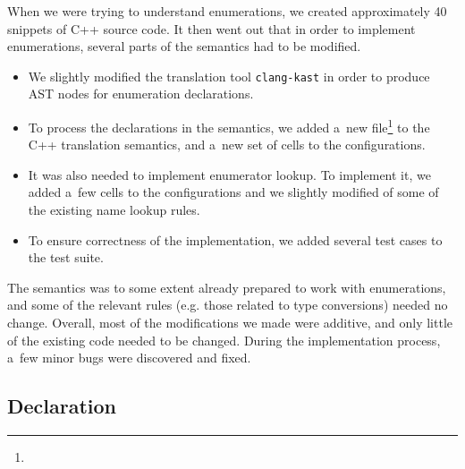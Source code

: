 \documentclass[nolot,nolof,nocover,printed]{fithesis3}
\newcommand{\clangKast}{\texttt{clang-kast}\xspace}
\begin{document}
When we were trying to understand enumerations, we created approximately 40 snippets of C++ source code. It then went out that in order to implement enumerations, several parts of the semantics had to be modified.
\begin{itemize}
\item We slightly modified the translation tool \clangKast in order to produce AST nodes for enumeration declarations.
\item To process the declarations in the semantics, we added a~new file\footnote{} to the C++ translation semantics, and a~new set of cells to the configurations.
\item It was also needed to implement enumerator lookup. To implement it, we added a~few cells to the configurations and we slightly modified of some of the existing name lookup rules.
\item To ensure correctness of the implementation, we added several test cases to the test suite.
\end{itemize}
The semantics was to some extent already prepared to work with enumerations, and some of the relevant rules (e.g. those related to type conversions) needed no change. Overall, most of the modifications we made were additive, and only little of the existing code needed to be changed. During the implementation process, a~few minor bugs were discovered and fixed. 


\subsection{Declaration}
\end{document}
